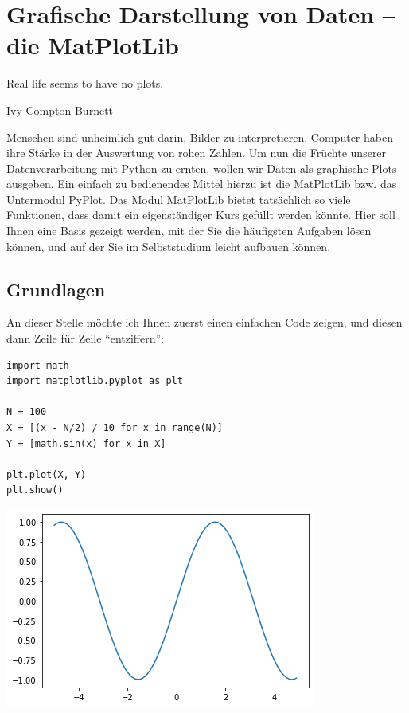 \chapter{Grafische Darstellung von Daten -- die MatPlotLib}
\label{chp:Matplotlib}
\epigraph{
	Real life seems to have no plots.
}{Ivy Compton-Burnett}

Menschen sind unheimlich gut darin, Bilder zu interpretieren. Computer haben ihre Stärke in der Auswertung von rohen Zahlen. Um nun die Früchte unserer Datenverarbeitung mit Python zu ernten, wollen wir Daten als graphische Plots ausgeben. Ein einfach zu bedienendes Mittel hierzu ist die MatPlotLib bzw. das Untermodul PyPlot. Das Modul MatPlotLib bietet tatsächlich so viele Funktionen, dass damit ein eigenständiger Kurs gefüllt werden könnte. Hier soll Ihnen eine Basis gezeigt werden, mit der Sie die häufigsten Aufgaben lösen können, und auf der Sie im Selbststudium leicht aufbauen können.

\section{Grundlagen}
An dieser Stelle möchte ich Ihnen zuerst einen einfachen Code zeigen, und diesen dann Zeile für Zeile \enquote{entziffern}:

\begin{codebox}[Beispiel: Einfacher Plot, width=.55\linewidth, nobeforeafter, equal height group = grpXmpSimplePlot]
\begin{verbatim}
import math
import matplotlib.pyplot as plt

N = 100
X = [(x - N/2) / 10 for x in range(N)]
Y = [math.sin(x) for x in X]

plt.plot(X, Y)
plt.show()
\end{verbatim}
\end{codebox}
%
\begin{tcolorbox}[title=Ausgabe: Einfacher Plot, width=.45\linewidth, nobeforeafter, equal height group = grpXmpSimplePlot]
	\includegraphics[width=\linewidth]{./gfx/plt-sin}
\end{tcolorbox}

